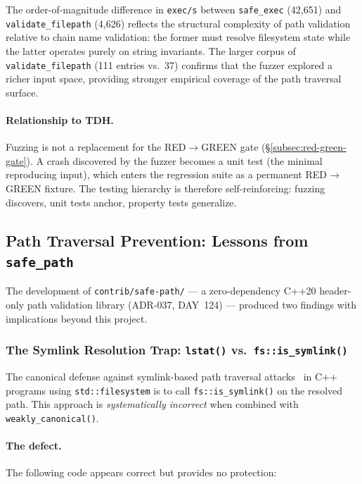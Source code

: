 \documentclass[11pt,a4paper]{article}
\begin{document}
    The order-of-magnitude difference in \texttt{exec/s} between
    \texttt{safe\_exec} (42{,}651) and \texttt{validate\_filepath} (4{,}626)
    reflects the structural complexity of path validation relative to chain name
    validation: the former must resolve filesystem state while the latter operates
    purely on string invariants. The larger corpus of \texttt{validate\_filepath}
    (111 entries vs.\ 37) confirms that the fuzzer explored a richer input space,
    providing stronger empirical coverage of the path traversal surface.

    \paragraph{Relationship to TDH.}
    Fuzzing is not a replacement for the RED$\to$GREEN gate
    (\S\ref{subsec:red-green-gate}). A crash discovered by the fuzzer becomes a
    unit test (the minimal reproducing input), which enters the regression suite
    as a permanent RED$\to$GREEN fixture. The testing hierarchy is therefore
    self-reinforcing: fuzzing discovers, unit tests anchor, property tests
    generalize.

    \subsection{Path Traversal Prevention: Lessons from \texttt{safe\_path}}
    \label{subsec:safe-path-lessons}

    The development of \texttt{contrib/safe-path/} --- a zero-dependency C++20 header-only
    path validation library (ADR-037, DAY~124) --- produced two findings with implications
    beyond this project.

    \subsubsection{The Symlink Resolution Trap: \texttt{lstat()} vs.\ \texttt{fs::is\_symlink()}}
    \label{subsubsec:symlink-trap}

    The canonical defense against symlink-based path traversal attacks~\cite{cwe59} in C++
    programs using \texttt{std::filesystem} is to call \texttt{fs::is\_symlink()} on the
    resolved path. This approach is \emph{systematically incorrect} when combined with
    \texttt{weakly\_canonical()}.

    \paragraph{The defect.}
    The following code appears correct but provides no protection:
\end{document}
